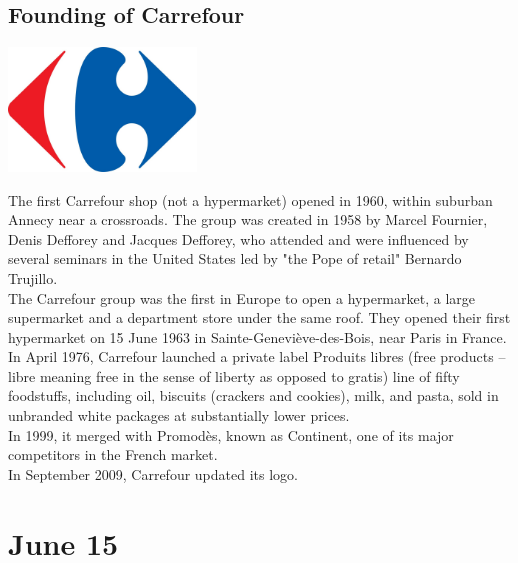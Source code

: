 \documentclass[11pt]{report}
\begin{document}
\subsection{Founding of Carrefour}
\vspace{2mm}\begin{center}\includegraphics[width=5cm]{./img/carrefourLogo.jpg}\end{center}
The first Carrefour shop (not a hypermarket) opened in 1960, within suburban Annecy near a crossroads. The group was created in 1958 by Marcel Fournier, Denis Defforey and Jacques Defforey, who attended and were influenced by several seminars in the United States led by "the Pope of retail" Bernardo Trujillo.\\ \indent The Carrefour group was the first in Europe to open a hypermarket, a large supermarket and a department store under the same roof. They opened their first hypermarket on 15 June 1963 in Sainte-Geneviève-des-Bois, near Paris in France.\\ \indent In April 1976, Carrefour launched a private label Produits libres (free products – libre meaning free in the sense of liberty as opposed to gratis) line of fifty foodstuffs, including oil, biscuits (crackers and cookies), milk, and pasta, sold in unbranded white packages at substantially lower prices.\\ \indent In 1999, it merged with Promodès, known as Continent, one of its major competitors in the French market.\\ \indent In September 2009, Carrefour updated its logo.
\section{June 15}
\end{document}
